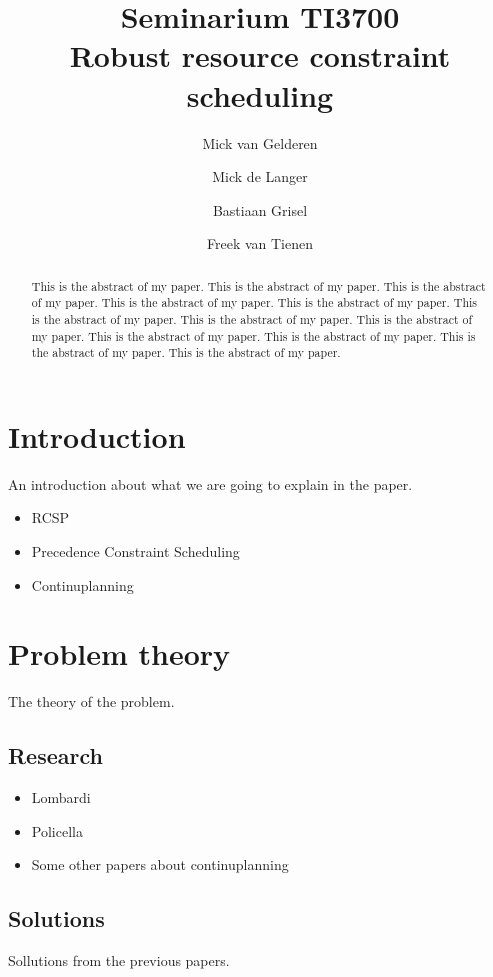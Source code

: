 \documentclass{article}
\title{Seminarium TI3700\\Robust resource constraint scheduling}
\author{Mick van Gelderen  \and
    Mick de Langer \and
    Bastiaan Grisel \and
    Freek van Tienen}
\date{}
\begin{document}
\maketitle
\thispagestyle{empty}

\begin{abstract}
This is the abstract of my paper.
This is the abstract of my paper.
This is the abstract of my paper.
This is the abstract of my paper.
This is the abstract of my paper.
This is the abstract of my paper.
This is the abstract of my paper.
This is the abstract of my paper.
This is the abstract of my paper.
This is the abstract of my paper.
This is the abstract of my paper.
This is the abstract of my paper.
\end{abstract}


\section{Introduction}

An introduction about what we are going to explain in the paper.

\begin{itemize}
\item RCSP
\item Precedence Constraint Scheduling
\item Continuplanning
\end{itemize}


\section{Problem theory}

The theory of the problem.

\subsection{Research}

\begin{itemize}
\item Lombardi
\item Policella
\item Some other papers about continuplanning
\end{itemize}

\subsection{Solutions}

Sollutions from the previous papers.
\end{document}

